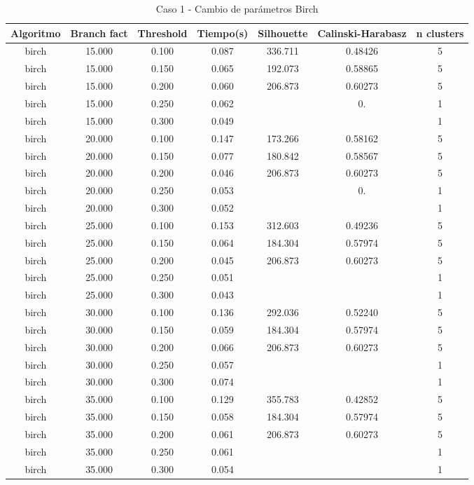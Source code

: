 \begin{table}[H]
\centering
\caption{Caso 1 - Cambio de parámetros Birch}
\label{tab:c1_birch}
\begin{tabular}{ccccccc}
\toprule
Algoritmo & Branch fact & Threshold & Tiempo(s) & Silhouette & Calinski-Harabasz & n clusters \\
\midrule
birch & 15.000 & 0.100 & 0.087 & 336.711 & 0.48426 & 5 \\
birch & 15.000 & 0.150 & 0.065 & 192.073 & 0.58865 & 5 \\
birch & 15.000 & 0.200 & 0.060 & 206.873 & 0.60273 & 5 \\
birch & 15.000 & 0.250 & 0.062 &  & 0. & 1 \\
birch & 15.000 & 0.300 & 0.049 &  &  & 1 \\
birch & 20.000 & 0.100 & 0.147 & 173.266 & 0.58162 & 5 \\
birch & 20.000 & 0.150 & 0.077 & 180.842 & 0.58567 & 5 \\
birch & 20.000 & 0.200 & 0.046 & 206.873 & 0.60273 & 5 \\
birch & 20.000 & 0.250 & 0.053 &  & 0. & 1 \\
birch & 20.000 & 0.300 & 0.052 &  &  & 1 \\
birch & 25.000 & 0.100 & 0.153 & 312.603 & 0.49236 & 5 \\
birch & 25.000 & 0.150 & 0.064 & 184.304 & 0.57974 & 5 \\
birch & 25.000 & 0.200 & 0.045 & 206.873 & 0.60273 & 5 \\
birch & 25.000 & 0.250 & 0.051 &  &  & 1 \\
birch & 25.000 & 0.300 & 0.043 &  &  & 1 \\
birch & 30.000 & 0.100 & 0.136 & 292.036 & 0.52240 & 5 \\
birch & 30.000 & 0.150 & 0.059 & 184.304 & 0.57974 & 5 \\
birch & 30.000 & 0.200 & 0.066 & 206.873 & 0.60273 & 5 \\
birch & 30.000 & 0.250 & 0.057 &  &  & 1 \\
birch & 30.000 & 0.300 & 0.074 &  &  & 1 \\
birch & 35.000 & 0.100 & 0.129 & 355.783 & 0.42852 & 5 \\
birch & 35.000 & 0.150 & 0.058 & 184.304 & 0.57974 & 5 \\
birch & 35.000 & 0.200 & 0.061 & 206.873 & 0.60273 & 5 \\
birch & 35.000 & 0.250 & 0.061 &  &  & 1 \\
birch & 35.000 & 0.300 & 0.054 &  &  & 1 \\
\bottomrule
\end{tabular}
\end{table}

